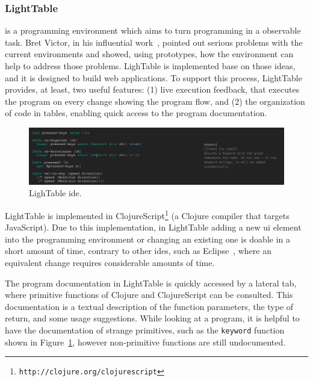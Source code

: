 \subsubsection{LightTable} is a programming environment which aims to turn programming in a observable task. Bret Victor, in his influential work~\cite{inventingPrin,learnableProg}, pointed out serious problems with the current environments and showed, using prototypes, how the environment can help to address those problems. LighTable is implemented base on those ideas, and it is designed to build web applications. To support this process, LightTable provides, at least, two useful features: (1) live execution feedback, that executes the program on every change showing the program flow, and (2) the organization of code in tables, enabling quick access to the program documentation.

\begin{figure}[!htbp]
\vspace{-10pt}
  \centering
  \includegraphics[width=1.0\textwidth]{img/lt2}
    \vspace{-15pt}
    \caption{LighTable \ac{ide}.}
    \vspace{-10pt}  
  \label{fig:lt}
\end{figure} 

LightTable is implemented in ClojureScript\footnote{\texttt{http://clojure.org/clojurescript}} (a Clojure compiler that targets JavaScript). Due to this implementation, in LightTable adding a new \ac{ui} element into the programming environment or changing an existing one is doable in a short amount of time, contrary to other \ac{ide}s, such as Eclipse~\cite{carlson2005eclipse}, where an equivalent change requires considerable amounts of time. 

The program documentation in LightTable is quickly accessed by a lateral tab, where primitive functions of Clojure and ClojureScript can be consulted. This documentation is a textual description of the function parameters, the type of return, and some usage suggestions. While looking at a program, it is helpful to have the documentation of strange primitives, such as the \texttt{keyword} function shown in Figure~\ref{fig:lt}, however non-primitive functions are still undocumented. 

